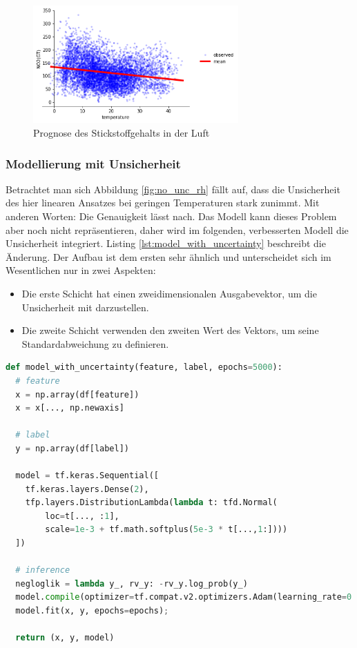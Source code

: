 \documentclass[12pt]{article}
\begin{document}
\begin{figure}[h]
    \centering
    \includegraphics[width=0.7\textwidth]{./figs/no_unc_no2.png}
    \caption{Prognose des Stickstoffgehalts in der Luft}
    \label{fig:no_unc_no2}
\end{figure}


\subsubsection{Modellierung mit Unsicherheit}
\label{sec:with_unc}

Betrachtet man sich Abbildung \ref{fig:no_unc_rh} fällt auf, dass die Unsicherheit des hier linearen Ansatzes bei geringen Temperaturen stark zunimmt. Mit anderen Worten: Die Genauigkeit lässt nach. Das Modell kann dieses Problem aber noch nicht repräsentieren, daher wird im folgenden, verbesserten Modell die Unsicherheit integriert. Listing \ref{lst:model_with_uncertainty} beschreibt die Änderung. Der Aufbau ist dem ersten sehr ähnlich und unterscheidet sich im Wesentlichen nur in zwei Aspekten: 

\begin{itemize}
  \item Die erste Schicht hat einen zweidimensionalen Ausgabevektor, um die Unsicherheit mit darzustellen.
  \item Die zweite Schicht verwenden den zweiten Wert des Vektors, um seine Standardabweichung zu definieren. 
\end{itemize}

\begin{lstlisting}[language=Python, caption={Modell mit Keras mit Unsicherheit}, label={lst:model_with_uncertainty}]
def model_with_uncertainty(feature, label, epochs=5000):
  # feature
  x = np.array(df[feature])
  x = x[..., np.newaxis]

  # label
  y = np.array(df[label])
  
  model = tf.keras.Sequential([
    tf.keras.layers.Dense(2),
    tfp.layers.DistributionLambda(lambda t: tfd.Normal(
        loc=t[..., :1],
        scale=1e-3 + tf.math.softplus(5e-3 * t[...,1:])))
  ])

  # inference
  negloglik = lambda y_, rv_y: -rv_y.log_prob(y_)
  model.compile(optimizer=tf.compat.v2.optimizers.Adam(learning_rate=0.01), loss=negloglik)
  model.fit(x, y, epochs=epochs);

  return (x, y, model)
\end{lstlisting}
\end{document}
